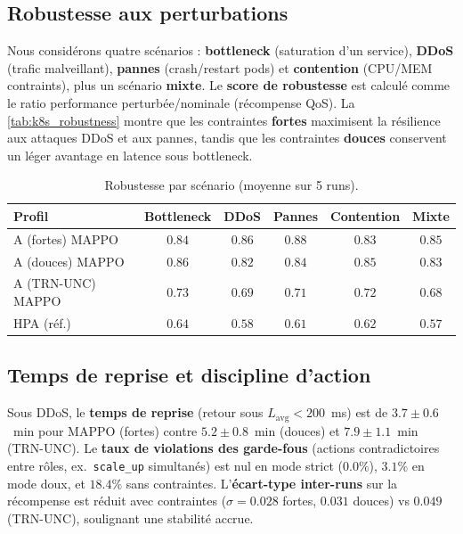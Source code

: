 \subsection*{Robustesse aux perturbations}

Nous considérons quatre scénarios : \textbf{bottleneck} (saturation d’un service), \textbf{DDoS} (trafic malveillant), \textbf{pannes} (crash/restart pods) et \textbf{contention} (CPU/MEM contraints), plus un scénario \textbf{mixte}.
Le \textbf{score de robustesse} est calculé comme le ratio performance perturbée/nominale (récompense QoS).
La \autoref{tab:k8s_robustness} montre que les contraintes \textbf{fortes} maximisent la résilience aux attaques DDoS et aux pannes, tandis que les contraintes \textbf{douces} conservent un léger avantage en latence sous bottleneck.

\begin{table}[h!]
  \centering
  \caption{Robustesse par scénario (moyenne sur 5 runs).}
  \label{tab:k8s_robustness}
  \renewcommand{\arraystretch}{1.2}
  \small
  \begin{tabular}{|l|c|c|c|c|c|}
    \hline
    \textbf{Profil}   & \textbf{Bottleneck} & \textbf{DDoS}   & \textbf{Pannes} & \textbf{Contention} & \textbf{Mixte}  \\
    \hline
    A (fortes) MAPPO  & $0.84$              & $\mathbf{0.86}$ & $\mathbf{0.88}$ & $0.83$              & $\mathbf{0.85}$ \\
    A (douces) MAPPO  & $\mathbf{0.86}$     & $0.82$          & $0.84$          & $\mathbf{0.85}$     & $0.83$          \\
    A (TRN-UNC) MAPPO & $0.73$              & $0.69$          & $0.71$          & $0.72$              & $0.68$          \\
    HPA (réf.)        & $0.64$              & $0.58$          & $0.61$          & $0.62$              & $0.57$          \\
    \hline
  \end{tabular}
\end{table}

\subsection*{Temps de reprise et discipline d’action}

Sous DDoS, le \textbf{temps de reprise} (retour sous $L_{\text{avg}}<200$~ms) est de $3.7 \pm 0.6$~min pour MAPPO (fortes) contre $5.2 \pm 0.8$~min (douces) et $7.9 \pm 1.1$~min (TRN-UNC).
Le \textbf{taux de violations des garde-fous} (actions contradictoires entre rôles, ex.~\texttt{scale\_up} simultanés) est nul en mode strict ($0.0\%$), $3.1\%$ en mode doux, et $18.4\%$ sans contraintes.
L’\textbf{écart-type inter-runs} sur la récompense est réduit avec contraintes ($\sigma=0.028$ fortes, $0.031$ douces) vs $0.049$ (TRN-UNC), soulignant une stabilité accrue.


